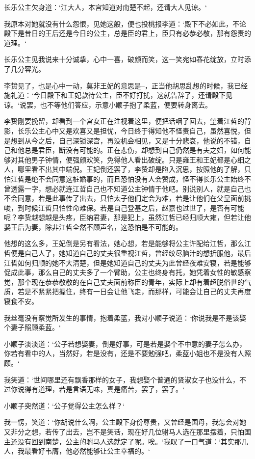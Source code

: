 长乐公主欠身道：‘江大人，本宫知道对南楚不起，还请大人见谅。‘

我原本对她就没有什么怨恨，见她这般，便也投桃报李道：‘殿下不必如此，不论殿下是昔日的王后还是今日的公主，总是臣的君上，臣只有必恭必敬，那有怨责的道理。‘

长乐公主见我说来十分诚挚，心中一喜，破颜而笑，这一笑宛如春花绽放，立时添了几分容光。

李贽见了，也是心中一动，莫非王妃的意思是--，正当他胡思乱想的时候，我已经施礼道：‘今日殿下和王妃款待公主，臣不好打扰，这就告辞了，还请殿下见谅。‘说罢，也不等他们答应，示意小顺子抱了柔蓝，便要转身离去。

李贽刚要挽留，却看到一个宫女正在注视着这里，便把话咽了回去，望着江哲的背影，长乐公主心中又是欢喜又是担忧，今日终于得知他不怪责自己，虽然喜悦，但是想到从今之后，自己深锁深宫，再没机会相见，又是十分悲哀，他说的不错，自己和他总是君臣，断没有可能的。正在悲伤，却想到自己仍然是有夫之妇，如何能够对其他男子钟情，便强颜欢笑，免得他人看出破绽。只是雍王和王妃都是心细之人，哪里看不出其中端倪。王妃倒还罢了，李贽却是陷入沉思，按照他的了解，只怕江哲是绝不会同意这桩婚事的，而且恐怕没有人会赞成，怪不得长乐公主始终不曾透露一字，想必就连江哲自己也不知道公主钟情于他吧。别说别人，就是自己也不会同意，若是此事传了出去，只怕太子他们定会为难，若是让他们在父皇面前挑唆，到时候江哲只怕性命难保。若是自己登基之后，赵嘉也过世了，是否有可能呢？李贽越想越是头疼，臣纳君妻，那是犯上，虽然江哲已经归顺大雍，但若让他娶王后为妻，除非江哲全然不顾声名，这恐怕是不可能的。

他想的这么多，王妃倒是另有看法，她心想，若是能够将公主许配给江哲，那么江哲便是自己人了，她知道自己的丈夫很重视江哲，曾经绞尽脑汁的想折服他，最后江哲如何归顺的她不大清楚，但是她知道自己的丈夫为此曾经夜难安寝，若是能够促成此事，那么自己的丈夫多了一个臂助，公主也终身有托，她凭着女性的敏感察觉，那个现在恭恭敬敬的在自己丈夫面前称臣的青年，实际上却有着超脱俗世的气质，若是不紧紧把握住，终有一日会让他飞走，而那样，可能会让自己的丈夫再度寝食不安。

我丝毫没有察觉所发生的事情，抱着柔蓝，我对小顺子说道：‘你说我是不是该娶个妻子照顾柔蓝。‘

小顺子淡淡道：‘公子若想娶妻，倒是好事，可是若是娶个不中意的妻子怎么办，你若有看中的人，当然好，若是没有，还是不要勉强吧，柔蓝小姐也不是没有人照顾。‘

我笑道：‘世间哪里还有飘香那样的女子，我想娶个普通的贤淑女子也没什么，不过你说得有道理，若是言语无味，真是痛苦，罢了，罢了。‘

小顺子突然道：‘公子觉得公主怎么样？‘

我一愣，笑道：‘你胡说什么啊，公主殿下身份尊贵，又曾经是国母，我怎会对她又非分之想，若传了出去，岂不是笑话，现在好几位驸马人选在那里摆着，只怕国主还没有回到南楚，公主的驸马人选就定了呢。唉。‘我叹了一口气道：‘其实那几人，我最看好韦膺，他必然能够让公主幸福的。‘

